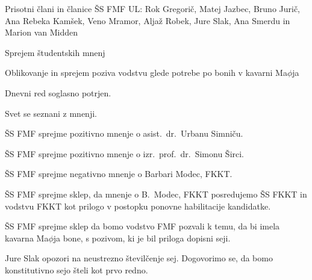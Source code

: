 \documentclass{seja}
\begin{document}
Prisotni člani in članice ŠS FMF UL:  Rok Gregorič, Matej Jazbec, Bruno Jurič,
Ana Rebeka Kamšek, Veno Mramor, Aljaž Robek, Jure Slak, Ana Smerdu in Marion van
Midden

\begin{red}
\item Sprejem študentskih mnenj
\item Oblikovanje in sprejem poziva vodstvu glede potrebe po bonih v kavarni
  Ma$\phi$ja
\end{red}
Dnevni red soglasno potrjen.

\begin{ad}
\item Svet se seznani z mnenji.

\begin{sklep*}
  ŠS FMF sprejme pozitivno mnenje o asist.~dr.~Urbanu Simniču.
\end{sklep*}

\begin{sklep*}
  ŠS FMF sprejme pozitivno mnenje o izr.~prof.~dr.~Simonu Širci.
\end{sklep*}

\begin{sklep*}
  ŠS FMF sprejme negativno mnenje o Barbari Modec, FKKT.
\end{sklep*}

\begin{sklep*}
  ŠS FMF sprejme sklep, da mnenje o B.~Modec, FKKT posredujemo ŠS
  FKKT in vodstvu FKKT kot prilogo v postopku ponovne habilitacije kandidatke.
\end{sklep*}

\item
\begin{sklep*}
ŠS FMF sprejme sklep da bomo vodstvo FMF pozvali k temu, da bi imela kavarna
Ma$\phi$ja bone, s pozivom, ki je bil priloga dopisni seji.
\end{sklep*}

\item Jure Slak opozori na neustrezno številčenje sej. Dogovorimo se, da bomo
  konstitutivno sejo šteli kot prvo redno.
\end{ad}
\end{document}
